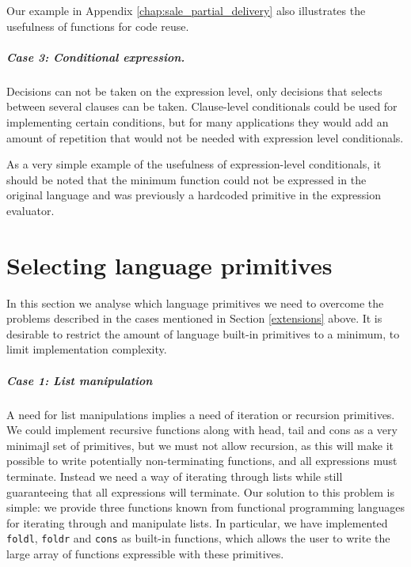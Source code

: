\documentclass[10pt,a4paper,final,oneside,openany,article]{memoir}
\begin{document}
Our example in Appendix \ref{chap:sale_partial_delivery} also
illustrates the usefulness of functions for code reuse.

\paragraph{Case 3: Conditional expression.} Decisions can not be taken
on the expression level, only decisions that selects between several
clauses can be taken. Clause-level conditionals could be used for
implementing certain conditions, but for many applications they would
add an amount of repetition that would not be needed with expression
level conditionals.

As a very simple example of the usefulness of expression-level
conditionals, it should be noted that the minimum function could not
be expressed in the original language and was previously a hardcoded
primitive in the expression evaluator.

\chapter{Selecting language primitives}
\label{primitives}
In this section we analyse which language primitives we need to
overcome the problems described in the cases mentioned in
Section \ref{extensions} above. It is desirable to restrict the amount of
language built-in primitives to a minimum, to limit implementation
complexity.

\paragraph{Case 1: List manipulation}
A need for list manipulations implies a need of iteration or recursion
primitives. We could implement recursive functions along with head,
tail and cons as a very minimajl set of primitives, but we must not
allow recursion, as this will make it possible to write potentially
non-terminating functions, and all expressions must terminate. Instead
we need a way of iterating through lists while still guaranteeing that
all expressions will terminate. Our solution to this problem is simple:
we provide three functions known from functional programming languages
for iterating through and manipulate lists. In particular, we have
implemented \lstinline{foldl}, \lstinline{foldr} and \lstinline{cons} as
built-in functions, which allows the user to write the large array of
functions expressible with these primitives.
\end{document}
